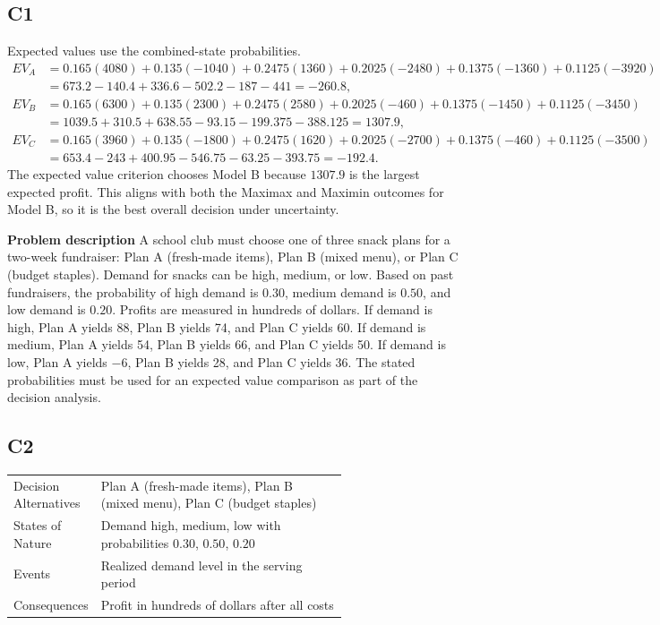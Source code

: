 \begin{ExamProblems}
		\subsection*{C1}
		Expected values use the combined-state probabilities.
		\[
		\begin{aligned}
		EV_A &= 0.165(4080)+0.135(-1040)+0.2475(1360)+0.2025(-2480)+0.1375(-1360)+0.1125(-3920)\\
		&= 673.2-140.4+336.6-502.2-187-441=-260.8,\\
		EV_B &= 0.165(6300)+0.135(2300)+0.2475(2580)+0.2025(-460)+0.1375(-1450)+0.1125(-3450)\\
		&= 1039.5+310.5+638.55-93.15-199.375-388.125=1307.9,\\
		EV_C &= 0.165(3960)+0.135(-1800)+0.2475(1620)+0.2025(-2700)+0.1375(-460)+0.1125(-3500)\\
		&= 653.4-243+400.95-546.75-63.25-393.75=-192.4.
		\end{aligned}
		\]
		The expected value criterion chooses Model B because $1307.9$ is the largest expected profit. This aligns with both the Maximax and Maximin outcomes for Model B, so it is the best overall decision under uncertainty.

		\item
		\textbf{Problem description}
		A school club must choose one of three snack plans for a two-week fundraiser: Plan A (fresh-made items),
		Plan B (mixed menu), or Plan C (budget staples). Demand for snacks can be high, medium, or low. Based on past fundraisers, the probability of high demand is $0.30$, medium demand is $0.50$, and low demand is $0.20$. Profits are measured in hundreds of dollars. If demand is high, Plan A yields 88, Plan B yields 74, and Plan C yields 60. If demand is medium, Plan A yields 54, Plan B yields 66, and Plan C yields 50. If demand is low, Plan A yields $-6$, Plan B yields 28, and Plan C yields 36. The stated probabilities must be used for an expected value comparison as part of the decision analysis.

		\subsection*{C2}
		\begin{center}
			\begin{tabular}{l p{0.74\linewidth}}
				\toprule
				Decision Alternatives & Plan A (fresh-made items), Plan B (mixed menu), Plan C (budget staples) \\
				States of Nature & Demand high, medium, low with probabilities $0.30$, $0.50$, $0.20$ \\
				Events & Realized demand level in the serving period \\
				Consequences & Profit in hundreds of dollars after all costs \\
				\bottomrule
			\end{tabular}
		\end{center}


\end{ExamProblems}
